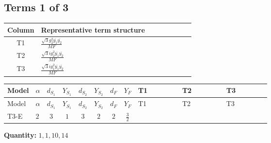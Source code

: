 \documentclass[8pt]{article}
\begin{document}
\begin{landscape}
\subsection*{Terms 1 of 3}
\begin{center}
\begin{tabular}{@{}c >{\raggedright\arraybackslash}p{0.82\linewidth}@{}}
\toprule
Column & Representative term structure \\
\midrule
T1 & \(\displaystyle \frac{\sqrt{3} g_{2}^{2} \overline{y_{1}} \overline{y_{2}}}{MF}\) \\
\midrule
T2 & \(\displaystyle \frac{\sqrt{3} i g_{2}^{2} \overline{y_{1}} \overline{y_{2}}}{MF}\) \\
\midrule
T3 & \(\displaystyle \frac{\sqrt{3} i g_{1}^{2} \overline{y_{1}} \overline{y_{2}}}{MF}\) \\
\midrule
\bottomrule
\end{tabular}
\end{center}
\smallskip
\tiny
\begin{longtable}{@{}llcccccc >{\raggedright\arraybackslash}p{0.21\linewidth} >{\raggedright\arraybackslash}p{0.21\linewidth} >{\raggedright\arraybackslash}p{0.21\linewidth}@{}}
\toprule
Model & $\alpha$ & $d_{S_1}$ & $Y_{S_1}$ & $d_{S_2}$ & $Y_{S_2}$ & $d_F$ & $Y_F$ & T1 & T2 & T3 \\
\midrule
\endfirsthead
\toprule
Model & $\alpha$ & $d_{S_1}$ & $Y_{S_1}$ & $d_{S_2}$ & $Y_{S_2}$ & $d_F$ & $Y_F$ & T1 & T2 & T3 \\
\midrule
\endhead
T3-E & $2$ & $3$ & $1$ & $3$ & $2$ & $2$ & $\frac{3}{2}$ & \scriptsize\adjustbox{max width=\linewidth}{$\begin{gathered} - \frac{\sqrt{3} g_{2}^{2} \overline{y_{1}} \overline{y_{2}}}{6 MF}\end{gathered}$} & \scriptsize\adjustbox{max width=\linewidth}{$\begin{gathered} - \frac{49 \sqrt{3} i g_{2}^{2} \overline{y_{1}} \overline{y_{2}}}{24 MF}\end{gathered}$} & \scriptsize\adjustbox{max width=\linewidth}{$\begin{gathered} - \frac{9 \sqrt{3} i g_{1}^{2} \overline{y_{1}} \overline{y_{2}}}{8 MF}\end{gathered}$} \\
\midrule
\bottomrule
\end{longtable}
\clearpage
\noindent\textbf{Quantity: }$\mathrm{1,1,10,14}$\par\smallskip

\end{landscape}
\end{document}
